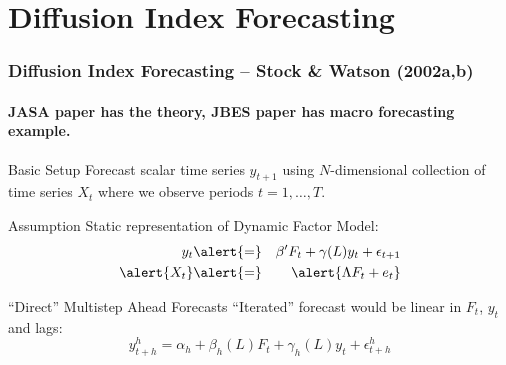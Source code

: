 \section{Diffusion Index Forecasting}
%
\begin{frame}[c]\frametitle{Diffusion Index Forecasting -- Stock \& Watson (2002a,b)}
 \framesubtitle{JASA paper has the theory, JBES paper has macro forecasting example.}

\begin{block}
	{Basic Setup}
	Forecast scalar time series $y_{t+1}$ using $N$-dimensional collection of time series $X_t$ where we observe periods $t = 1, \hdots, T$.
\end{block}

\begin{block}
	{Assumption}
	Static representation of Dynamic Factor Model:
	\begin{eqnarray*}
		y_{t}&\alert{=}& \beta' F_t + \gamma(L)y_t + \epsilon_{t+1}\\
		\alert{X_t} &\alert{=}& \alert{\Lambda F_t + e_t}
	\end{eqnarray*}
\end{block}

\begin{block}
	{``Direct'' Multistep Ahead Forecasts}
	``Iterated'' forecast would be linear in $F_t$, $y_t$ and lags:
	$$y_{t+h}^h = \alpha_h + \beta_h(L)F_t +  \gamma_h(L)y_t + \epsilon^h_{t+h}$$
\end{block}
\end{frame}

